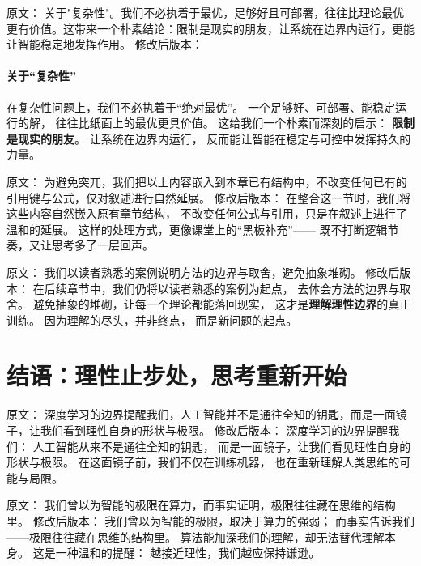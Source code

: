 原文：
关于"复杂性"。我们不必执着于最优，足够好且可部署，往往比理论最优更有价值。这带来一个朴素结论：限制是现实的朋友，让系统在边界内运行，更能让智能稳定地发挥作用。
修改后版本：
\paragraph{关于“复杂性”}
在复杂性问题上，我们不必执着于“绝对最优”。  
一个足够好、可部署、能稳定运行的解，  
往往比纸面上的最优更具价值。  
这给我们一个朴素而深刻的启示：  
\textbf{限制是现实的朋友}。  
让系统在边界内运行，  
反而能让智能在稳定与可控中发挥持久的力量。



原文：
为避免突兀，我们把以上内容嵌入到本章已有结构中，不改变任何已有的引用键与公式，仅对叙述进行自然延展。
修改后版本：
在整合这一节时，我们将这些内容自然嵌入原有章节结构，  
不改变任何公式与引用，只是在叙述上进行了温和的延展。  
这样的处理方式，更像课堂上的“黑板补充”——  
既不打断逻辑节奏，又让思考多了一层回声。



原文：
我们以读者熟悉的案例说明方法的边界与取舍，避免抽象堆砌。
修改后版本：
在后续章节中，我们仍将以读者熟悉的案例为起点，  
去体会方法的边界与取舍。  
避免抽象的堆砌，让每一个理论都能落回现实，  
这才是\textbf{理解理性边界}的真正训练。  
因为理解的尽头，并非终点，  
而是新问题的起点。

\section*{结语：理性止步处，思考重新开始}

原文：
深度学习的边界提醒我们，人工智能并不是通往全知的钥匙，而是一面镜子，让我们看到理性自身的形状与极限。
修改后版本：
深度学习的边界提醒我们：  
人工智能从来不是通往全知的钥匙，  
而是一面镜子，让我们看见理性自身的形状与极限。  
在这面镜子前，我们不仅在训练机器，  
也在重新理解人类思维的可能与局限。



原文：
我们曾以为智能的极限在算力，而事实证明，极限往往藏在思维的结构里。
修改后版本：
我们曾以为智能的极限，取决于算力的强弱；  
而事实告诉我们——极限往往藏在思维的结构里。  
算法能加深我们的理解，却无法替代理解本身。  
这是一种温和的提醒：  
越接近理性，我们越应保持谦逊。



